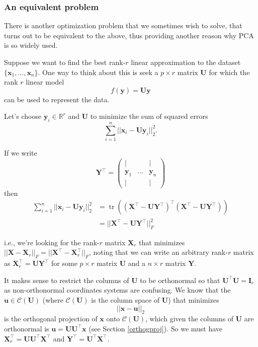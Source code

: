 \documentclass[]{book}
\theoremstyle{definition}
\theoremstyle{definition}
\theoremstyle{definition}
\theoremstyle{remark}
\begin{document}
\hypertarget{an-equivalent-problem}{%
\subsubsection*{An equivalent problem}\label{an-equivalent-problem}}

There is another optimization problem that we sometimes wish to solve, that turns out to be equivalent to the above, thus providing another reason why PCA is so widely used.

Suppose we want to find the best rank-\(r\) linear approximation to the dataset \(\{\mathbf x_1, \ldots, \mathbf x_n\}\). One way to think about this is seek a \(p\times r\) matrix \(\mathbf U\) for which the rank \(r\) linear model
\[f(\mathbf y) = \mathbf U\mathbf y\] can be used to represent the data.

Let's choose \(\mathbf y_i\in \mathbb{R}^r\) and \(\mathbf U\) to minimize the sum of squared errors
\[\sum_{i=1}^n ||\mathbf x_i - \mathbf U\mathbf y_i||^2_2.\]

If we write
\[\mathbf Y^\top = \begin{pmatrix} 
| &&|\\
\mathbf y_1& \ldots & \mathbf y_n\\
| &&|
\end{pmatrix}\]
then
\begin{align*}
\sum_{i=1}^n ||\mathbf x_i - \mathbf U\mathbf y_i||^2_2 &=\operatorname{tr}((\mathbf X^\top - \mathbf U\mathbf Y^\top)^\top (\mathbf X^\top - \mathbf U\mathbf Y^\top))\\
&=||\mathbf X^\top - \mathbf U\mathbf Y^\top||_F^2
\end{align*}

i.e., we're looking for the rank-\(r\) matrix \(\mathbf X_r\) that minimizes \(||\mathbf X- \mathbf X_r||_F=||\mathbf X^\top - \mathbf X_r^\top||_F\), noting that we can write an arbitrary rank-\(r\) matrix as \(\mathbf X_r^\top = \mathbf U\mathbf Y^\top\) for some \(p\times r\) matrix \(\mathbf U\) and a \(n \times r\) matrix \(\mathbf Y\).

It makes sense to restrict the columns of \(\mathbf U\) to be orthonormal so that \(\mathbf U^\top \mathbf U=\mathbf I_r\) as non-orthonormal coordinates systems are confusing. We know that the \(\mathbf u\in \mathcal{C}(\mathbf U)\) (where \(\mathcal{C}(\mathbf U)\) is the column space of \(\mathbf U\)) that minimizes
\[||\mathbf x-\mathbf u||_2\]
is the orthogonal projection of \(\mathbf x\) onto \(\mathcal{C}(\mathbf U)\), which given the columns of \(\mathbf U\) are orthonormal is \(\mathbf u= \mathbf U\mathbf U^\top \mathbf x\) (see Section \ref{orthogproj}). So we must have \(\mathbf X_r^\top = \mathbf U\mathbf U^\top \mathbf X^\top\) and \(\mathbf Y^\top = \mathbf U^\top \mathbf X^\top\).
\end{document}

